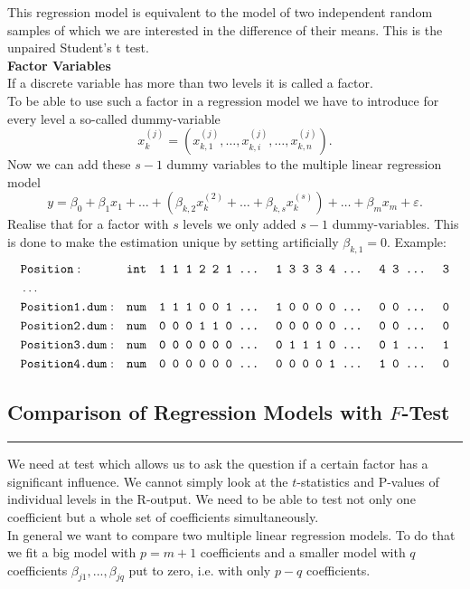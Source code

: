 This regression model is equivalent to the model of two independent random samples of which we are interested in the difference of their means. This is the unpaired Student’s t test.\\

\textbf{Factor Variables}\\
If a discrete variable has more than two levels it is called a factor.\\
To be able to use such a factor in a regression model we have to introduce for every level a so-called dummy-variable
\begin{equation}
  x_k^{(j)} = \left(x_{k,1}^{(j)}, \dots ,x_{k,i}^{(j)}, \dots, x_{k,n}^{(j)}\right).
\end{equation}
Now we can add these $s - 1$ dummy variables to the multiple linear regression model
\begin{equation}
  y = \beta_0 + \beta_1 x_1 + \dots + (\beta_{k,2}x^{(2)}_k + \dots + \beta_{k,s}x^{(s)}_k) + \dots + \beta_m x_m + \varepsilon.
\end{equation}
Realise that for a factor with $s$ levels we only added $s - 1$ dummy-variables. This is done to make the estimation unique by setting artificially $\beta_{k,1} = 0$.
Example:
\begin{align*}
  \scriptstyle
  &\texttt{Position}:      & &\texttt{int}  &\texttt{1 1 1 2 2 1 \dots\; 1 3 3 3 4 \dots\; 4 3 \dots\; 3}\\
  &\dots\\
  &\texttt{Position1.dum}: & &\texttt{num}  &\texttt{1 1 1 0 0 1 \dots\; 1 0 0 0 0 \dots\; 0 0 \dots\; 0}\\
  &\texttt{Position2.dum}: & &\texttt{num}  &\texttt{0 0 0 1 1 0 \dots\; 0 0 0 0 0 \dots\; 0 0 \dots\; 0}\\
  &\texttt{Position3.dum}: & &\texttt{num}  &\texttt{0 0 0 0 0 0 \dots\; 0 1 1 1 0 \dots\; 0 1 \dots\; 1}\\
  &\texttt{Position4.dum}: & &\texttt{num}  &\texttt{0 0 0 0 0 0 \dots\; 0 0 0 0 1 \dots\; 1 0 \dots\; 0}
\end{align*}

\subsection{Comparison of Regression Models with $F$-Test}
\noindent\rule[\linienAbstand]{\linewidth}{\linienDicke}
We need at test which allows us to ask the question if a certain factor has a significant influence. We cannot simply look at the $t$-statistics and P-values of individual levels in the R-output. We need to be able to test not only one coefficient but a whole set of coefficients simultaneously.\\
In general we want to compare two multiple linear regression models. To do that we fit a big
model with $p = m + 1$ coefficients and a smaller model with $q$ coefficients $\beta_{j1} , . . . , \beta_{jq}$ put to zero, i.e. with only $p - q$ coefficients.\\

